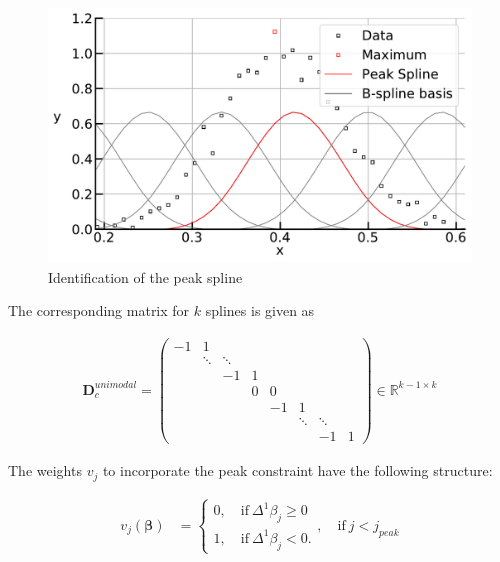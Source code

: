 \documentclass[10pt,a4paper]{article}
\begin{document}
	\begin{figure}[H]
		\centering
		\includegraphics[width=\linewidth]{../thesisplots/peak_spline.pdf}
		\caption{Identification of the peak spline}
		\label{fig:peak_spline}
	\end{figure}
	
	
	The corresponding matrix for $k$ splines is given as 
	
	\begin{align}\label{eq:D_c_unimodal}
		\boldsymbol{D}_c^{unimodal} = \begin{pmatrix} -1 & 1 \\ 
									    				 & \ddots & \ddots  \\
									                     &        &     -1 & 1 & \\
									    			     & 		  & 	   & 0 & 0 & \\ 
													     &		  &		   &   &-1 & 1 \\
													     &		  &		   &   &   &\ddots & \ddots \\
													     & 	      &        &   &   &       &  -1    & 1
					 \end{pmatrix} \in \mathbb{R}^{k-1 \times k}
	\end{align}
	
	The weights $v_j$ to incorporate the peak constraint have the following structure:
	
	\begin{align}\label{eq:v_peak_1}
		v_j(\boldsymbol{\beta}) &= \begin{cases} 
										0, \quad \text{if} \ \Delta^1\beta_j \ge 0 \\ 
										1, \quad \text{if} \ \Delta^1\beta_j  < 0.
								  \end{cases}, \quad \text{if} \ j < j_{peak}
	\end{align}
	
\end{document}
